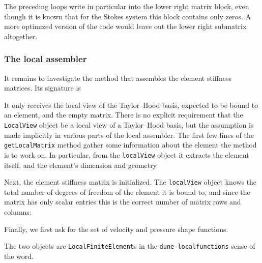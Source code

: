 \documentclass[a4paper,10pt,headings=normal,bibliography=totoc]{scrartcl}
\newcommand{\cpp}[1]{\lstinline[basicstyle=\ttfamily]!#1!}
\newcommand{\dunemodule}[1]{\texttt{#1}}
\begin{document}
The preceding loops write in particular into the lower right matrix block, even though
it is known that for the Stokes
system this block contains only zeros.  A more optimized version of the code would leave out the lower right
submatrix altogether.

\subsubsection{The local assembler}

It remains to investigate the method that assembles the element stiffness matrices.  Its signature is
%

%
It only receives the local view of the Taylor--Hood basis, expected to be bound to an element,
and the empty matrix.  There is no explicit requirement that the \cpp{LocalView} object
be a local view of a Taylor--Hood basis, but the assumption is made implicitly in various
parts of the local assembler.
The first few lines of the \cpp{getLocalMatrix} method gather some information about the element the method is to work on.
In particular, from the \cpp{localView} object it extracts the element itself, and the element's dimension and
geometry
%

%
Next, the element stiffness matrix is initialized.  The \cpp{localView} object knows the total number of
degrees of freedom of the element it is bound to, and since the matrix has only scalar entries this is the correct
number of matrix rows and columns:
%

%
Finally, we first ask for the set of velocity and pressure shape functions.
%

%
The two objects are \cpp{LocalFiniteElement}s in the \dunemodule{dune-localfunctions} sense of the word.
\end{document}
